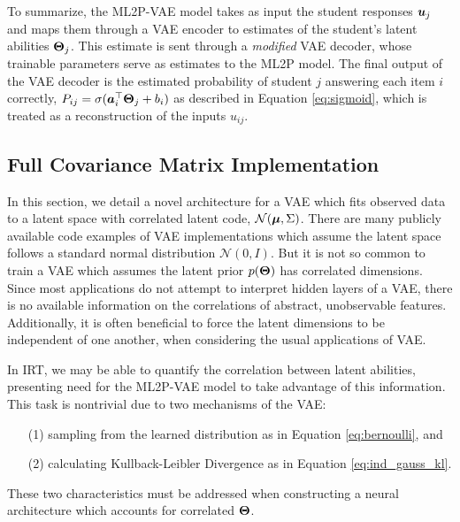 
To summarize, the ML2P-VAE model takes as input the student responses $\boldsymbol{u}_j$ and maps them through a VAE encoder to estimates of the student's latent abilities $\boldsymbol{\Theta}_j$. This estimate is sent through a \textit{modified} VAE decoder, whose trainable parameters serve as estimates to the ML2P model. The final output of the VAE decoder is the estimated probability of student $j$ answering each item $i$ correctly, $P_{ij} = \sigma(\boldsymbol{a}_i^\top \boldsymbol{\Theta}_j + b_i)$ as described in Equation \ref{eq:sigmoid}, which is treated as a reconstruction of the inputs $u_{ij}$.


\subsection{Full Covariance Matrix Implementation}\label{sec:cov}
In this section, we detail a novel architecture for a VAE which fits observed data to a latent space with correlated latent code, $\mathcal{N}(\boldsymbol{\mu}, \Sigma)$. There are many publicly available code examples of VAE implementations which assume the latent space follows a standard normal distribution $\mathcal{N}(0,I)$. But it is not so common to train a VAE which assumes the latent prior $p(\boldsymbol{\Theta})$ has correlated dimensions. Since most applications do not attempt to interpret hidden layers of a VAE, there is no available information on the correlations of abstract, unobservable features. Additionally, it is often beneficial to force the latent dimensions to be independent of one another, when considering the usual applications of VAE.

In IRT, we may be able to quantify the correlation between latent abilities, presenting need for the ML2P-VAE model to take advantage of this information. This task is nontrivial due to two mechanisms of the VAE:
\begin{itemize}
  \item[(1)] sampling from the learned distribution as in Equation \ref{eq:bernoulli}, and
  \item[(2)] calculating Kullback-Leibler Divergence as in Equation \ref{eq:ind_gauss_kl}.
\end{itemize}
These two characteristics must be addressed when constructing a neural architecture which accounts for correlated $\boldsymbol{\Theta}$.

